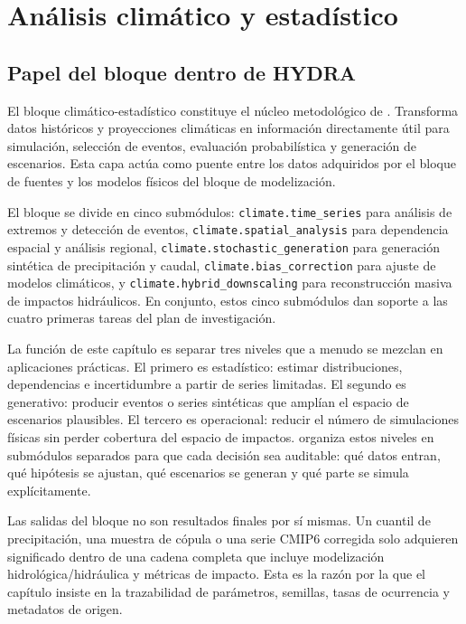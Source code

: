 \chapter{Análisis climático y estadístico}
\label{ch:clima_estadistica}

\section{Papel del bloque dentro de HYDRA}

El bloque climático-estadístico constituye el núcleo metodológico de \hydra. Transforma datos históricos y proyecciones climáticas en información directamente útil para simulación, selección de eventos, evaluación probabilística y generación de escenarios. Esta capa actúa como puente entre los datos adquiridos por el bloque de fuentes y los modelos físicos del bloque de modelización.

El bloque se divide en cinco submódulos: \texttt{climate.time\_series} para análisis de extremos y detección de eventos, \texttt{climate.spatial\_analysis} para dependencia espacial y análisis regional, \texttt{climate.stochastic\_generation} para generación sintética de precipitación y caudal, \texttt{climate.bias\_correction} para ajuste de modelos climáticos, y \texttt{climate.hybrid\_downscaling} para reconstrucción masiva de impactos hidráulicos. En conjunto, estos cinco submódulos dan soporte a las cuatro primeras tareas del plan de investigación.

La función de este capítulo es separar tres niveles que a menudo se mezclan en aplicaciones prácticas. El primero es estadístico: estimar distribuciones, dependencias e incertidumbre a partir de series limitadas. El segundo es generativo: producir eventos o series sintéticas que amplían el espacio de escenarios plausibles. El tercero es operacional: reducir el número de simulaciones físicas sin perder cobertura del espacio de impactos. \pyhydra organiza estos niveles en submódulos separados para que cada decisión sea auditable: qué datos entran, qué hipótesis se ajustan, qué escenarios se generan y qué parte se simula explícitamente.

Las salidas del bloque no son resultados finales por sí mismas. Un cuantil de precipitación, una muestra de cópula o una serie CMIP6 corregida solo adquieren significado dentro de una cadena completa que incluye modelización hidrológica/hidráulica y métricas de impacto. Esta es la razón por la que el capítulo insiste en la trazabilidad de parámetros, semillas, tasas de ocurrencia y metadatos de origen.

